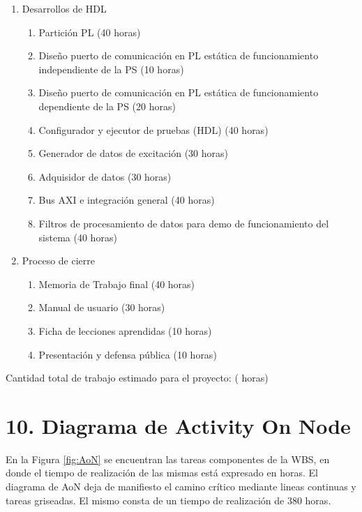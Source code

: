 \documentclass[
11pt, %
]{charter}
\begin{document}
\begin{enumerate}
	\item Desarrollos de HDL
	\begin{enumerate}
		\item Partición PL (40 horas)		
		\item Diseño puerto de comunicación en PL estática de funcionamiento independiente de la PS (10 horas)
		\item Diseño puerto de comunicación en PL estática de funcionamiento dependiente de la PS (20 horas)
		\item Configurador y ejecutor de pruebas (HDL) (40 horas)
		\item Generador de datos de excitación (30 horas)
		\item Adquisidor de datos (30 horas)
		\item Bus AXI e integración general (40 horas)
		\item Filtros de procesamiento de datos para demo de funcionamiento del sistema (40 horas)
	\end{enumerate}
	
	\item Proceso de cierre
	\begin{enumerate}
		\item Memoria de Trabajo final (40 horas)
		\item Manual de usuario (30 horas)
		\item Ficha de lecciones aprendidas (10 horas)
		\item Presentación y defensa pública (10 horas)
	\end{enumerate}
	
	
\end{enumerate}

Cantidad total de trabajo estimado para el proyecto: ({\projecteffort} horas)

\section{10. Diagrama de Activity On Node}
\label{sec:AoN}

En la Figura \ref{fig:AoN} se encuentran las tareas componentes de la WBS, en donde el tiempo de realización de las mismas está expresado en horas. El diagrama de AoN deja de manifiesto el camino crítico mediante lineas continuas y tareas griseadas. El mismo consta de un tiempo de realización de 380 horas.
\end{document}
